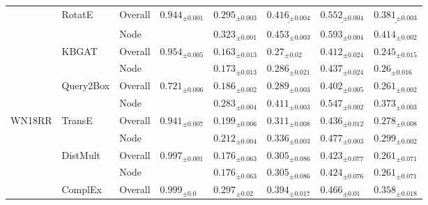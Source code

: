 \begin{table}[!ht]
\begin{adjustbox}{width=\textwidth}
\begin{tabular}{llllllll}
         & RotatE & Overall &  ${{0.944}_{\pm 0.001}}$ &     $\mathbf{{0.295}_{\pm 0.003}}$ &  $\underline{{0.416}_{\pm 0.004}}$ &  $\underline{{0.552}_{\pm 0.004}}$ &  $\underline{{0.381}_{\pm 0.003}}$ \\
         &           & Node &                          &     $\mathbf{{0.323}_{\pm 0.001}}$ &     $\mathbf{{0.453}_{\pm 0.003}}$ &     $\mathbf{{0.593}_{\pm 0.004}}$ &     $\mathbf{{0.414}_{\pm 0.002}}$ \\
         & KBGAT & Overall &  ${{0.954}_{\pm 0.005}}$ &            ${{0.163}_{\pm 0.013}}$ &              ${{0.27}_{\pm 0.02}}$ &            ${{0.412}_{\pm 0.024}}$ &            ${{0.245}_{\pm 0.015}}$ \\
         &           & Node &                          &            ${{0.173}_{\pm 0.013}}$ &            ${{0.286}_{\pm 0.021}}$ &            ${{0.437}_{\pm 0.024}}$ &             ${{0.26}_{\pm 0.016}}$ \\
         & Query2Box & Overall &  ${{0.721}_{\pm 0.006}}$ &     $\mathbf{{0.186}_{\pm 0.002}}$ &     $\mathbf{{0.289}_{\pm 0.003}}$ &     $\mathbf{{0.402}_{\pm 0.005}}$ &     $\mathbf{{0.261}_{\pm 0.002}}$ \\
         &           & Node &                          &     $\mathbf{{0.283}_{\pm 0.004}}$ &     $\mathbf{{0.411}_{\pm 0.003}}$ &     $\mathbf{{0.547}_{\pm 0.002}}$ &     $\mathbf{{0.373}_{\pm 0.003}}$ \\
\midrule
WN18RR & TransE & Overall &  ${{0.941}_{\pm 0.007}}$ &     $\mathbf{{0.199}_{\pm 0.006}}$ &     $\mathbf{{0.311}_{\pm 0.008}}$ &     $\mathbf{{0.436}_{\pm 0.012}}$ &     $\mathbf{{0.278}_{\pm 0.008}}$ \\
         &           & Node &                          &     $\mathbf{{0.212}_{\pm 0.004}}$ &     $\mathbf{{0.336}_{\pm 0.003}}$ &     $\mathbf{{0.477}_{\pm 0.003}}$ &     $\mathbf{{0.299}_{\pm 0.002}}$ \\
         & DistMult & Overall &  ${{0.997}_{\pm 0.001}}$ &            ${{0.176}_{\pm 0.063}}$ &            ${{0.305}_{\pm 0.086}}$ &            ${{0.423}_{\pm 0.077}}$ &            ${{0.261}_{\pm 0.071}}$ \\
         &           & Node &                          &            ${{0.176}_{\pm 0.063}}$ &            ${{0.305}_{\pm 0.086}}$ &            ${{0.424}_{\pm 0.076}}$ &            ${{0.261}_{\pm 0.071}}$ \\
         & ComplEx & Overall &    ${{0.999}_{\pm 0.0}}$ &             ${{0.297}_{\pm 0.02}}$ &            ${{0.394}_{\pm 0.017}}$ &             ${{0.466}_{\pm 0.01}}$ &            ${{0.358}_{\pm 0.018}}$ \\

\end{tabular}
\end{adjustbox}
\end{table}
